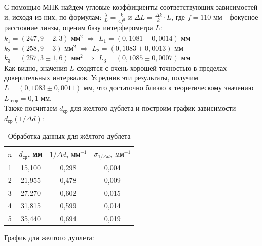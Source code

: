 \documentclass[a4paper,12pt]{extarticle}
\begin{document}
С помощью МНК найдем угловые коэффициенты соответствующих зависимостей и, исходя из них, по формулам: $\frac{\lambda}{L} = \frac{k}{4 f^2}$ и $\Delta L =\frac{\Delta k}{k} \cdot L$, где $f = 110$ мм - фокусное расстояние линзы, оценим базу интерферометра $L$:\\
$k_1 = (247,9 \pm 2,3)$ $\text{мм}^2$ $\Rightarrow$ $L_1 = (0,1081 \pm 0,0014)$ мм\\
$k_2 = (258,9 \pm 3)$ $\text{мм}^2$ $\Rightarrow$ $L_2 = (0,1083 \pm 0,0013)$ мм\\
$k_3 = (257,3 \pm 1,6)$ $\text{мм}^2$ $\Rightarrow$ $L_3 = (0,1085 \pm 0,0007)$ мм\\
Как видно, значения $L$ сходятся с очень хорошей точностью в пределах доверительных интервалов. Усреднив эти результаты, получим $L = (0,1083 \pm 0,0011)$ мм, что достаточно близко к теоретическому значению $L_{\text{теор}} = 0,1$ мм.\\
Также посчитаем $d_{\text{ср}}$ для желтого дублета и построим график зависимости $d_{\text{ср}}(1/\Delta d)$:
\begin{table}[H]
\centering
\begin{tabular}{|c|c|c|c|}
\hline
$n$ & $d_{\text{ср}}$, мм & $1/\Delta d$, $\text{мм}^{-1}$ & $\sigma_{1/\Delta d}$, $\text{мм}^{-1}$ \\ \hline
1 & 15,100 & 0,298 & 0,004 \\ \hline
2 & 21,955 & 0,478 & 0,009 \\ \hline
3 & 27,270 & 0,602 & 0,015 \\ \hline
4 & 31,815 & 0,599 & 0,014 \\ \hline
5 & 35,440 & 0,694 & 0,019 \\ \hline
\end{tabular}
\caption{Обработка данных для жёлтого дублета}
\end{table}
График для желтого дуплета:
\begin{minipage}{0.6\textwidth}
\end{minipage}
\end{document}
